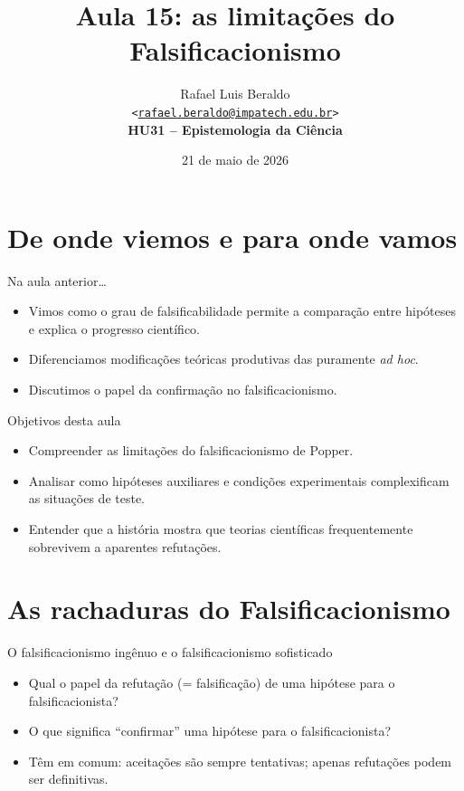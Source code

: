 \documentclass[numbering=fraction,aspectratio=169]{beamer}
\title{Aula 15: as limitações do Falsificacionismo}
\author[Rafael Beraldo]{Rafael Luis Beraldo\\
  \texttt{<\href{mailto:rafael.beraldo@impatech.edu.br}{rafael.beraldo@impatech.edu.br}>}\\
  \textbf{HU31 – Epistemologia da Ciência}}
\institute{\IMPATech}
\date{21 de maio de 2026}
\begin{document}
\frenchspacing

\begin{frame}[plain]{}
  \maketitle
\end{frame}



\section{De onde viemos e para onde vamos}

\begin{frame}{Na aula anterior…}
  \begin{itemize}
  \item Vimos como o \alert{grau de falsificabilidade} permite a comparação entre hipóteses e explica o progresso científico.
  \item Diferenciamos modificações teóricas produtivas das puramente \alert{\emph{ad hoc}}.
  \item Discutimos o papel da \alert{confirmação} no falsificacionismo.
  \end{itemize}
\end{frame}

\begin{frame}{Objetivos desta aula}
  \begin{itemize}
  \item Compreender as \alert{limitações do falsificacionismo} de Popper.
  \item Analisar como \alert{hipóteses auxiliares} e condições experimentais complexificam as situações de teste.
  \item Entender que a história mostra que teorias científicas frequentemente \alert{sobrevivem a aparentes refutações}.
  \end{itemize}
\end{frame}



\section{As rachaduras do Falsificacionismo}

\begin{frame}{O falsificacionismo ingênuo e o falsificacionismo sofisticado}
  \begin{itemize}
  \item<1-> Qual o \alert<1>{papel da refutação} (= falsificação) de uma hipótese para o falsificacionista?
  \item<2-> O que significa \alert<2>{“confirmar” uma hipótese} para o falsificacionista?
  \item<3-> Têm em comum: \alert<3>{aceitações são sempre tentativas}; apenas \alert<4>{refutações podem ser definitivas}.
  \end{itemize}
\end{frame}
\end{document}
